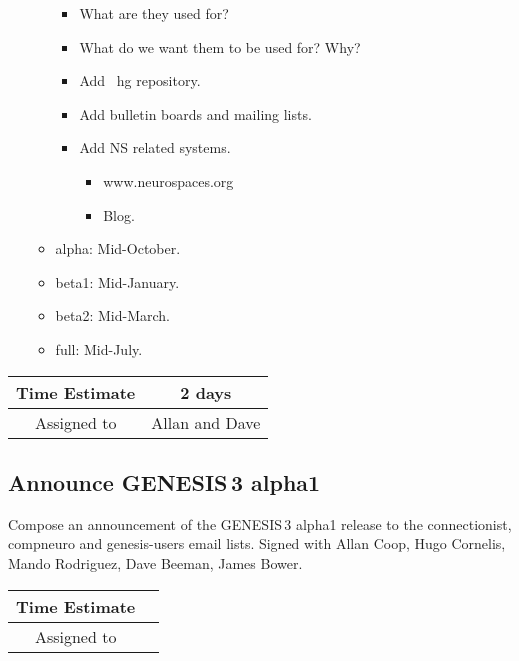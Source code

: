 \documentclass[12pt]{article}
\begin{document}
\begin{itemize}
\begin{itemize}
\begin{itemize}
    \item What are they used for?
    \item What do we want them to be used for? Why?
    \item Add {\ hg} repository.
    \item Add bulletin boards and mailing lists.
    \item Add NS related systems.
      \begin{itemize}
      \item www.neurospaces.org
      \item Blog.
      \end{itemize}
    \end{itemize}
  \item alpha: Mid-October.
  \item beta1: Mid-January.
  \item beta2: Mid-March.
  \item full: Mid-July.
  \end{itemize}
\end{itemize}

\begin{center}
  \vspace{5mm}
  \centering
  \begin{tabular}{|c|c|}
    \hline
    Time Estimate
    & 2 days \\
    \hline
    Assigned to
    & Allan and Dave \\
    \hline
  \end{tabular}
\end{center}


\subsection{Announce GENESIS\,3 alpha1}

Compose an announcement of the GENESIS\,3 alpha1 release to the
connectionist, compneuro and genesis-users email lists.  Signed with
Allan Coop, Hugo Cornelis, Mando Rodriguez, Dave Beeman, James Bower.

\begin{center}
  \vspace{5mm}
  \centering
  \begin{tabular}{|c|c|}
    \hline
    Time Estimate
    & \\
    \hline
    Assigned to
    & \\
    \hline
  \end{tabular}
\end{center}
\end{document}
